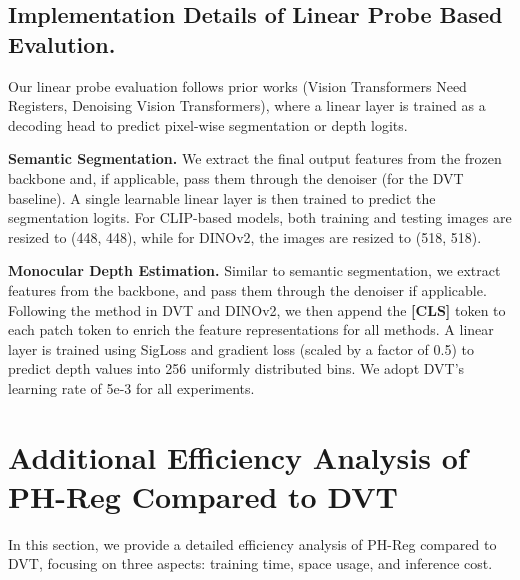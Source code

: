 \documentclass{article}
\begin{document}
\subsection{Implementation Details of Linear Probe Based Evalution.}
\label{linearimpl}
Our linear probe evaluation follows prior works (Vision Transformers Need Registers, Denoising Vision Transformers), where a linear layer is trained as a decoding head to predict pixel-wise segmentation or depth logits.

\textbf{Semantic Segmentation.} We extract the final output features from the frozen backbone and, if applicable, pass them through the denoiser (for the DVT baseline). A single learnable linear layer is then trained to predict the segmentation logits. For CLIP-based models, both training and testing images are resized to (448, 448), while for DINOv2, the images are resized to (518, 518).

\textbf{Monocular Depth Estimation.}
Similar to semantic segmentation, we extract features from the backbone, and pass them through the denoiser if applicable. Following the method in DVT and DINOv2, we then append the \textbf{[CLS]} token to each patch token to enrich the feature representations for all methods. 
A linear layer is trained using SigLoss and gradient loss (scaled by a factor of 0.5) to predict depth values into 256 uniformly distributed bins. We adopt DVT's learning rate of 5e-3 for all experiments. 
 \section{Additional Efficiency Analysis of PH-Reg Compared to DVT}\label{efficiency}
In this section, we provide a detailed efficiency analysis of PH-Reg compared to DVT, focusing on three aspects: training time, space usage, and inference cost.
\end{document}
